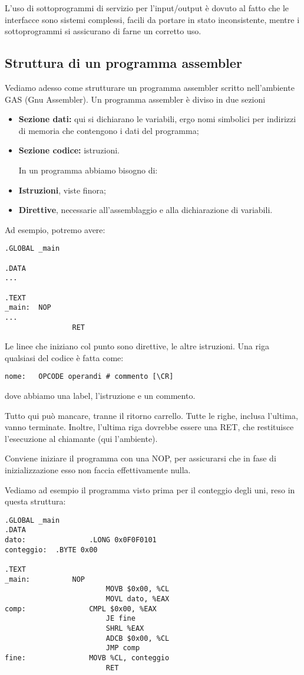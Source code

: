 \documentclass[a4paper,11pt]{article}
\begin{document}
L'uso di sottoprogrammi di servizio per l'input/output è dovuto al fatto che le interfacce sono sistemi complessi, facili da portare in stato inconsistente, mentre i sottoprogrammi si assicurano di farne un corretto uso.

\subsection{Struttura di un programma assembler}
Vediamo adesso come strutturare un programma assembler scritto nell'ambiente GAS (Gnu Assembler).
Un programma assembler è diviso in due sezioni
\begin{itemize}
	\item \textbf{Sezione dati:} qui si dichiarano le variabili, ergo nomi simbolici per indirizzi di memoria che contengono i dati del programma;
	\item \textbf{Sezione codice:} istruzioni.


In un programma abbiamo bisogno di:
\end{itemize}


\begin{itemize}
	\item \textbf{Istruzioni}, viste finora;
	\item \textbf{Direttive}, necessarie all'assemblaggio e alla dichiarazione di variabili.
\end{itemize}

Ad esempio, potremo avere:
\begin{lstlisting}	
.GLOBAL _main

.DATA
...

.TEXT
_main:	NOP
...
				RET
\end{lstlisting}

Le linee che iniziano col punto sono direttive, le altre istruzioni.
Una riga qualsiasi del codice è fatta come:
\begin{lstlisting}	
nome:	OPCODE operandi # commento [\CR]
\end{lstlisting}
dove abbiamo una label, l'istruzione e un commento.

Tutto qui può mancare, tranne il ritorno carrello.
Tutte le righe, inclusa l'ultima, vanno terminate.
Inoltre, l'ultima riga dovrebbe essere una RET, che restituisce l'esecuzione al chiamante (qui l'ambiente).

Conviene iniziare il programma con una NOP, per assicurarsi che in fase di inizializzazione esso non faccia effettivamente nulla.

Vediamo ad esempio il programma visto prima per il conteggio degli uni, reso in questa struttura:
\begin{lstlisting} 
.GLOBAL _main
.DATA
dato:				.LONG 0x0F0F0101
conteggio:	.BYTE 0x00

.TEXT
_main:			NOP
						MOVB $0x00, %CL
						MOVL dato, %EAX
comp:				CMPL $0x00, %EAX
						JE fine
						SHRL %EAX
						ADCB $0x00, %CL
						JMP comp
fine:				MOVB %CL, conteggio
						RET
\end{lstlisting}
\end{document}
